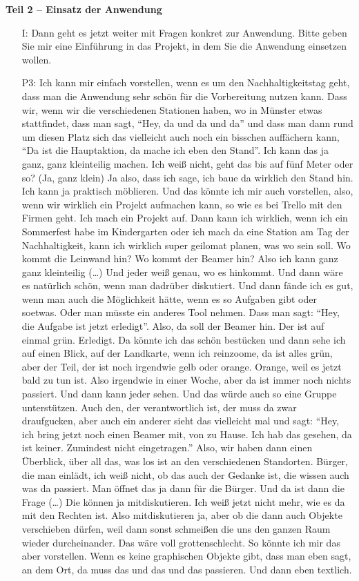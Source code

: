 \textbf{Teil 2 -- Einsatz der Anwendung}
\begin{itemize}
    \item[I:] Dann geht es jetzt weiter mit Fragen konkret zur Anwendung. Bitte geben Sie mir eine Einf{\"u}hrung in das Projekt, in dem Sie die Anwendung einsetzen wollen.
    \item[P3:] Ich kann mir einfach vorstellen, wenn es um den Nachhaltigkeitstag geht, dass man die Anwendung sehr sch{\"o}n f{\"u}r die Vorbereitung nutzen kann. Dass wir, wenn wir die verschiedenen Stationen haben, wo in M{\"u}nster etwas stattfindet, dass man sagt, "`Hey, da und da und da"' und dass man dann rund um diesen Platz sich das vielleicht auch noch ein bisschen auff{\"a}chern kann, "`Da ist die Hauptaktion, da mache ich eben den Stand"'. Ich kann das ja ganz, ganz kleinteilig machen. Ich wei{\ss} nicht, geht das bis auf f{\"u}nf Meter oder so? (Ja, ganz klein) Ja also, dass ich sage, ich baue da wirklich den Stand hin. Ich kann ja praktisch m{\"o}blieren. Und das k{\"o}nnte ich mir auch vorstellen, also, wenn wir wirklich ein Projekt aufmachen kann, so wie es bei Trello mit den Firmen geht. Ich mach ein Projekt auf. Dann kann ich wirklich, wenn ich ein Sommerfest habe im Kindergarten oder ich mach da eine Station am Tag der Nachhaltigkeit, kann ich wirklich super geilomat planen, was wo sein soll. Wo kommt die Leinwand hin? Wo kommt der Beamer hin? Also ich kann ganz ganz kleinteilig (\dots) Und jeder wei{\ss} genau, wo es hinkommt. Und dann w{\"a}re es nat{\"u}rlich sch{\"o}n, wenn man dadr{\"u}ber diskutiert. Und dann f{\"a}nde ich es gut, wenn man auch die M{\"o}glichkeit h{\"a}tte, wenn es so Aufgaben gibt oder soetwas. Oder man m{\"u}sste ein anderes Tool nehmen. Dass man sagt: "`Hey, die Aufgabe ist jetzt erledigt"'. Also, da soll der Beamer hin. Der ist auf einmal gr{\"u}n. Erledigt. Da k{\"o}nnte ich das sch{\"o}n best{\"u}cken und dann sehe ich auf einen Blick, auf der Landkarte, wenn ich reinzoome, da ist alles gr{\"u}n, aber der Teil, der ist noch irgendwie gelb oder orange. Orange, weil es jetzt bald zu tun ist. Also irgendwie in einer Woche, aber da ist immer noch nichts passiert. Und dann kann jeder sehen. Und das w{\"u}rde auch so eine Gruppe unterst{\"u}tzen. Auch den, der verantwortlich ist, der muss da zwar draufgucken, aber auch ein anderer sieht das vielleicht mal und sagt: "`Hey, ich bring jetzt noch einen Beamer mit, von zu Hause. Ich hab das gesehen, da ist keiner. Zumindest nicht eingetragen."' Also, wir haben dann einen {\"U}berblick, {\"u}ber all das, was los ist an den verschiedenen Standorten. B{\"u}rger, die man einl{\"a}dt, ich wei{\ss} nicht, ob das auch der Gedanke ist, die wissen auch was da passiert. Man {\"o}ffnet das ja dann f{\"u}r die B{\"u}rger. Und da ist dann die Frage (\dots) Die k{\"o}nnen ja mitdiskutieren. Ich wei{\ss} jetzt nicht mehr, wie es da mit den Rechten ist. Also mitdiskutieren ja, aber ob die dann auch Objekte verschieben d{\"u}rfen, weil dann sonst schmei{\ss}en die uns den ganzen Raum wieder durcheinander. Das w{\"a}re voll grottenschlecht. So k{\"o}nnte ich mir das aber vorstellen. Wenn es keine graphischen Objekte gibt, dass man eben sagt, an dem Ort, da muss das und das und das passieren. Und dann eben textlich.

\end{itemize}
